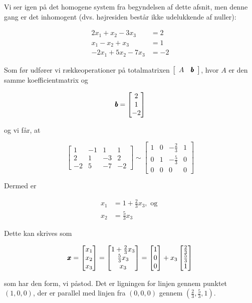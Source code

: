 \begin{example} Vi ser igen på det homogene system fra begyndelsen af dette afsnit, men denne gang er det inhomogent (dvs. højresiden består ikke udelukkende af nuller):

\[
\begin{aligned}
2 x_1 + x_2 - 3 x_3 & = 2 \\
x_1 - x_2 + x_3 & = 1 \\
-2 x_1 + 5 x_2 - 7 x_3 & = -2
\end{aligned}
\]

Som før udfører vi rækkeoperationer på totalmatrixen \(\left[\begin{array}{cc} A & \pmb{b} \end{array}\right]\), hvor \( A \) er den samme koefficientmatrix og

\[
\pmb{b} = \begin{bmatrix}
2 \\
1 \\
-2
\end{bmatrix}
\]

og vi får, at

\[
\left[\begin{array}{cccc}
1 & -1 & 1 & 1 \\
2 & 1 & -3 & 2 \\
-2 & 5 & -7 & -2
\end{array}\right]
\sim
\left[\begin{array}{cccc}
1 & 0 & -\frac{2}{3} & 1 \\
0 & 1 & -\frac{5}{3} & 0 \\
0 & 0 & 0 & 0
\end{array}\right]
\]

Dermed er

\[
\begin{aligned}
x_1 &= 1 + \frac{2}{3} x_3, \text{ og } \\
x_2 &= \frac{5}{3} x_3
\end{aligned}
\]

Dette kan skrives som

\[
\pmb{x} = \begin{bmatrix}
x_1 \\
x_2 \\
x_3
\end{bmatrix} =
\begin{bmatrix}
1 + \frac{2}{3} x_3 \\
\frac{5}{3} x_3 \\
x_3
\end{bmatrix}
= \begin{bmatrix}
1 \\
0 \\
0
\end{bmatrix} + x_3 \begin{bmatrix}
\frac{2}{3} \\
\frac{5}{3} \\
1
\end{bmatrix}
\]

som har den form, vi påstod. Det er ligningen for linjen gennem punktet \((1,0,0)\), der er parallel med linjen fra \((0,0,0)\) gennem \(\left(\frac{2}{3}, \frac{5}{3}, 1\right)\).

\end{example}

